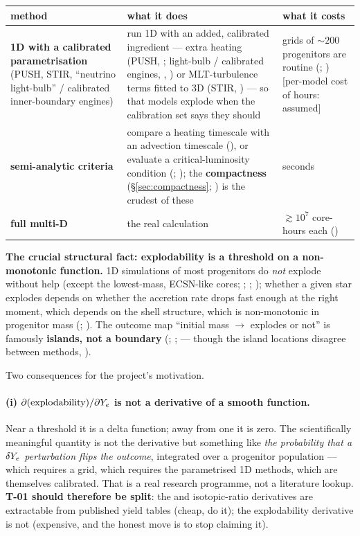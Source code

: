 \begingroup\small
\begin{tabularx}{\textwidth}{@{}L{3.4cm} Y L{3.6cm}@{}}
\toprule
\textbf{method} & \textbf{what it does} & \textbf{what it costs} \\
\midrule
\textbf{1D with a calibrated parametrisation} (PUSH, STIR, ``neutrino
light-bulb'' / calibrated inner-boundary engines) &
run 1D with an added, calibrated ingredient --- extra heating (PUSH,
\citealt{perego2015}; light-bulb / calibrated engines, \citealt{ugliano2012},
\citealt{sukhbold2016}) or MLT-turbulence terms fitted to 3D (STIR,
\citealt{couch2020}) --- so that models explode when the calibration set says
they should &
grids of $\sim 200$ progenitors are routine (\citealt{sukhbold2016};
\citealt{couch2020}) [per-model cost of hours: assumed] \\
\textbf{semi-analytic criteria} &
compare a heating timescale with an advection timescale
(\citealt{muller2016a}), or evaluate a critical-luminosity condition
(\citealt{burrows1993}; \citealt{pejcha2015}); the \textbf{compactness} \xic{}
(\S\ref{sec:compactness}; \citealt{oconnor2011}) is the crudest of these &
seconds \\
\textbf{full multi-D} & the real calculation &
$\gtrsim 10^7$ core-hours each (\citealt{couch2020}) \\
\bottomrule
\end{tabularx}
\endgroup

\textbf{The crucial structural fact: explodability is a threshold on a
non-monotonic function.} 1D simulations of most progenitors do \emph{not}
explode without help (except the lowest-mass, ECSN-like cores;
\citealt{janka2012}; \citealt{couch2020}; \citealt{burrows2021}); whether a
given star explodes depends on whether the accretion rate drops fast enough at
the right moment, which depends on the shell structure, which is non-monotonic
in progenitor mass (\citealt{ertl2016}; \citealt{sukhbold2018}). The outcome
map ``initial mass $\to$ explodes or not'' is famously \textbf{islands, not a
boundary} (\citealt{ugliano2012}; \citealt{ertl2016}; \citealt{sukhbold2016}
--- though the island locations disagree between methods,
\citealt{boccioli2024}).

Two consequences for the project's motivation.

\paragraph{(i) $\partial(\text{explodability})/\partial Y_{e}$ is not a derivative
of a smooth function.} Near a threshold it is a delta function; away from one
it is zero. The scientifically meaningful quantity is not the derivative but
something like \emph{the probability that a $\delta Y_{e}$ perturbation flips the
outcome}, integrated over a progenitor population --- which requires a grid,
which requires the parametrised 1D methods, which are themselves calibrated.
That is a real research programme, not a literature lookup. \textbf{T-01 should
therefore be split}: the  and isotopic-ratio derivatives are
extractable from published yield tables (cheap, do it); the explodability
derivative is not (expensive, and the honest move is to stop claiming it).


